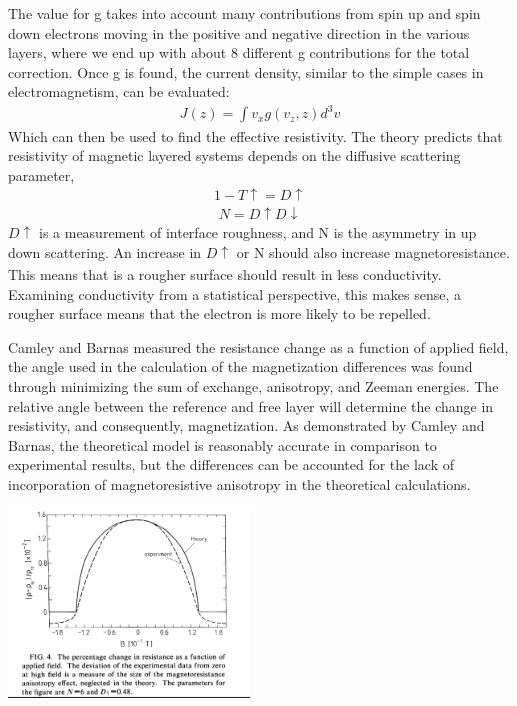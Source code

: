 \documentclass[11pt]{article}
\begin{document}
\begin{multicols}{2}
The value for g takes into account many contributions from spin up and spin down electrons moving in the positive and negative direction in the various layers, where we end up with about 8 different g contributions for the total correction. Once g is found, the current density, similar to  the simple cases in electromagnetism, can be evaluated:
\begin{align*}
J(z) = \int v_x g(v_z,z)d^3 v  
\end{align*}
Which can then be used to find the effective resistivity. The theory predicts that resistivity of magnetic layered systems depends on the diffusive scattering parameter, 
\begin{align*}
1-T \uparrow= D \uparrow
\end{align*}
\begin{align*}
N = D \uparrow D \downarrow 
\end{align*}
$D\uparrow$ is a measurement of interface roughness, and N is the asymmetry in up down scattering. An increase in $D\uparrow$ or N should also increase magnetoresistance\textsubscript{\cite{label2}}. This means that is a rougher surface should result in less conductivity. Examining conductivity from a statistical perspective, this makes sense, a rougher surface means that the electron is more likely to be repelled. 

Camley and Barnas measured the resistance change as a function of applied field, the angle used in the calculation of the magnetization differences was found through minimizing the sum of exchange, anisotropy, and Zeeman energies. The relative angle between the reference and free layer will determine the change in resistivity, and consequently, magnetization. As demonstrated by Camley and Barnas, the theoretical model is reasonably accurate in comparison to experimental results, but the differences can be accounted for the lack of incorporation of magnetoresistive anisotropy in the theoretical calculations. 

\begin{center}
	\centering
	\includegraphics[width=0.48\textwidth]{exp_vs_theory.png}
	{\footnotesize\textbf \textsubscript{\cite{label2}}}
\end{center} 



\end{multicols}
\end{document}
